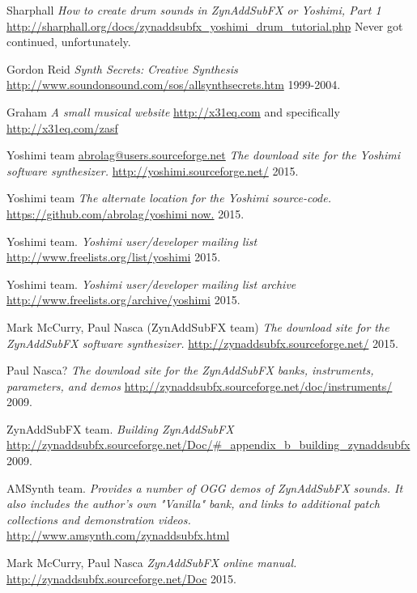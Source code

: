 \begin{thebibliography}{99}
   Sharphall
   \emph{How to create drum sounds in ZynAddSubFX or Yoshimi, Part 1}
   \url{http://sharphall.org/docs/zynaddsubfx\_yoshimi\_drum\_tutorial.php}
   Never got continued, unfortunately.

   Gordon Reid
   \emph{Synth Secrets:  Creative Synthesis}
   \url{http://www.soundonsound.com/sos/allsynthsecrets.htm}
   1999-2004.

   Graham
   \emph{A small musical website}
   \url{http://x31eq.com} and specifically
   \url{http://x31eq.com/zasf}

   Yoshimi team \url{abrolag@users.sourceforge.net}
   \emph{The download site for the Yoshimi software synthesizer.}
   \url{http://yoshimi.sourceforge.net/}
   2015.

   Yoshimi team
   \emph{The alternate location for the Yoshimi source-code.}
   \url{https://github.com/abrolag/yoshimi now.}
   2015.

   Yoshimi team.
   \emph{Yoshimi user/developer mailing list}
   \url{http://www.freelists.org/list/yoshimi}
   2015.

   Yoshimi team.
   \emph{Yoshimi user/developer mailing list archive}
   \url{http://www.freelists.org/archive/yoshimi}
   2015.

   Mark McCurry, Paul Nasca (ZynAddSubFX team)
   \emph{The download site for the ZynAddSubFX software synthesizer.}
   \url{http://zynaddsubfx.sourceforge.net/}
   2015.

   Paul Nasca?
   \emph{The download site for the ZynAddSubFX banks, instruments,
      parameters, and demos}
   \url{http://zynaddsubfx.sourceforge.net/doc/instruments/}
   2009.

   ZynAddSubFX team.
   \emph{Building ZynAddSubFX}
   \url{http://zynaddsubfx.sourceforge.net/Doc/#_appendix_b_building_zynaddsubfx}
   2009.

   AMSynth team.
   \emph{Provides a number of OGG demos of ZynAddSubFX sounds. It
   also includes the author's own "Vanilla" bank, and links to additional
   patch collections and demonstration videos.}
   \url{http://www.amsynth.com/zynaddsubfx.html}

   Mark McCurry, Paul Nasca
   \emph{ZynAddSubFX online manual.}
   \url{http://zynaddsubfx.sourceforge.net/Doc}
   2015.


\end{thebibliography}

